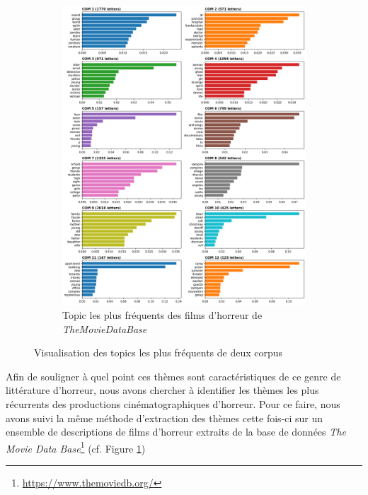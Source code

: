 \documentclass[12pt,a4paper,oneside,titlepage]{book} %
\begin{document}
\begin{figure}[htbp]
\begin{subfigure}{0.45\textwidth}
		\includegraphics[width=\textwidth]{illustration/tf_idf_topic_tmdb.png}
		\caption{Topic les plus fréquents des films d'horreur de \emph{TheMovieDataBase}}
		\label{fig:topic_tmdb}
	\end{subfigure}
	\caption{Visualisation des topics les plus fréquents de deux corpus}
	\label{fig:topics_corpus}
	\end{figure}
	
	Afin de souligner à quel point ces thèmes sont caractéristiques de ce genre de littérature d'horreur, nous avons chercher à identifier les thèmes les plus récurrents des productions cinématographiques d'horreur.
	Pour ce faire, nous avons suivi la même méthode d'extraction des thèmes cette fois-ci sur un ensemble de descriptions de films d'horreur extraits de la base de données \textit{The Movie Data Base}\footnote{\url{https://www.themoviedb.org/}} (cf. Figure \ref{fig:topic_tmdb})	
	
\end{document}
